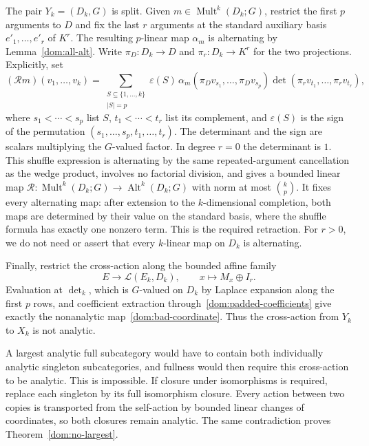 \documentclass[11pt]{amsart}
\theoremstyle{definition}
\theoremstyle{remark}
\numberwithin{equation}{section}
\newcommand{\cL}{\mathcal L}
\newcommand{\Alt}{\operatorname{Alt}}
\newcommand{\Mult}{\operatorname{Mult}}
\theoremstyle{plain}
\theoremstyle{definition}
\theoremstyle{plain}
\begin{document}
The pair $Y_k=(D_k,G)$ is split. Given $m\in\Mult^k(D_k;G)$, restrict the first $p$ arguments to
$D$ and fix the last $r$ arguments at the standard auxiliary basis $e'_1,\ldots,e'_r$ of $K^r$.
The resulting $p$-linear map $\alpha_m$ is alternating by Lemma~\ref{dom:all-alt}. Write
$\pi_D\colon D_k\to D$ and $\pi_r\colon D_k\to K^r$ for the two projections. Explicitly, set
\[
 (\mathcal Rm)(v_1,\ldots,v_k)=
 \sum_{\substack{S\subseteq\{1,\ldots,k\}\\|S|=p}}
 \varepsilon(S)\,
 \alpha_m(\pi_Dv_{s_1},\ldots,\pi_Dv_{s_p})
 \det(\pi_rv_{t_1},\ldots,\pi_rv_{t_r}),
\]
where $s_1<\cdots<s_p$ list $S$, $t_1<\cdots<t_r$ list its complement, and $\varepsilon(S)$
is the sign of the permutation $(s_1,\ldots,s_p,t_1,\ldots,t_r)$. The determinant and the sign
are scalars multiplying the $G$-valued factor. In degree $r=0$ the determinant is $1$.
This shuffle expression is alternating by the same repeated-argument cancellation as the wedge
product, involves no factorial division, and gives a bounded linear map
$\mathcal R\colon\Mult^k(D_k;G)\to\Alt^k(D_k;G)$ with norm at most $\binom{k}{p}$.
It fixes every alternating map: after extension to the $k$\nobreakdash-dimensional completion, both maps
are determined by their value on the standard basis, where the shuffle formula has exactly one nonzero
term. This is the required retraction. For $r>0$, we do not need or assert that every $k$\nobreakdash-linear
map on $D_k$ is alternating.

Finally, restrict the cross-action along the bounded affine family
\[
E\longrightarrow\cL(E_k,D_k),\qquad x\longmapsto M_x\oplus I_r.
\]
Evaluation at $\det_k$, which is $G$\nobreakdash-valued on $D_k$ by Laplace expansion along the first $p$ rows, and coefficient extraction through~\eqref{dom:padded-coefficients} give exactly
the nonanalytic map~\eqref{dom:bad-coordinate}. Thus the cross-action from $Y_k$ to $X_k$ is not analytic.

A largest analytic full subcategory would have to contain both individually analytic singleton
subcategories, and fullness would then require this cross-action to be analytic. This is impossible.
If closure under isomorphisms is required, replace each singleton by its full isomorphism closure.
Every action between two copies is transported from the self-action by bounded linear changes of
coordinates, so both closures remain analytic. The same contradiction proves Theorem~\ref{dom:no-largest}.
\end{document}
